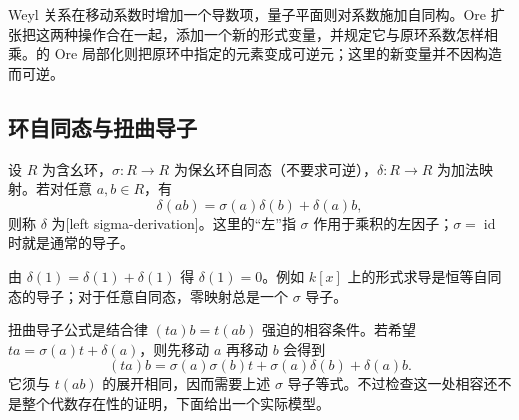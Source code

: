 

Weyl 关系在移动系数时增加一个导数项，量子平面则对系数施加自同构。Ore 扩张把这两种操作合在一起，添加一个新的形式变量，并规定它与原环系数怎样相乘。的 Ore 局部化则把原环中指定的元素变成可逆元；这里的新变量并不因构造而可逆。

%
%

\subsection{环自同态与扭曲导子}
\label{b2:subsec:2005:01}

\begin{definition}\label{b2:def:sigma-derivation}
	设 \(R\) 为含幺环，\(\sigma:R\to R\) 为保幺环自同态（不要求可逆），\(\delta:R\to R\) 为加法映射。若对任意 \(a,b\in R\)，有
	\[
		\delta(ab)=\sigma(a)\delta(b)+\delta(a)b,
	\]
	则称 \(\delta\) 为[left sigma-derivation]。这里的“左”指 \(\sigma\) 作用于乘积的左因子；\(\sigma=\operatorname{id}\) 时就是通常的导子。
\end{definition}

由 \(\delta(1)=\delta(1)+\delta(1)\) 得 \(\delta(1)=0\)。例如 \(k[x]\) 上的形式求导是恒等自同态的导子；对于任意自同态，零映射总是一个 \(\sigma\) 导子。

\ProseParagraphBreak
扭曲导子公式是结合律 \((ta)b=t(ab)\) 强迫的相容条件。若希望 \(ta=\sigma(a)t+\delta(a)\)，则先移动 \(a\) 再移动 \(b\) 会得到
\[
	(ta)b=\sigma(a)\sigma(b)t+\sigma(a)\delta(b)+\delta(a)b.
\]
它须与 \(t(ab)\) 的展开相同，因而需要上述 \(\sigma\) 导子等式。不过检查这一处相容还不是整个代数存在性的证明，下面给出一个实际模型。

